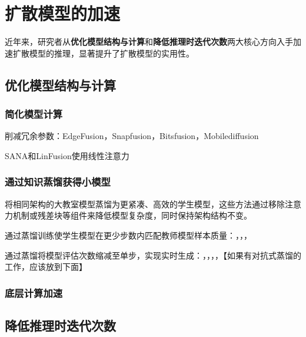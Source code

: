 \documentclass[11pt,a4paper,UTF8]{ctexart}
\begin{document}
\section{扩散模型的加速}

近年来，研究者从\textbf{优化模型结构与计算}和\textbf{降低推理时迭代次数}两大核心方向入手加速扩散模型的推理，显著提升了扩散模型的实用性。

\subsection{优化模型结构与计算}

\subsubsection{简化模型计算}

削减冗余参数：EdgeFusion\cite{castells2024edgefusion}，Snapfusion\cite{li2023snapfusion}，Bitsfusion\cite{sui2024bitsfusion}，Mobilediffusion\cite{zhao2024mobilediffusion}

SANA\cite{xie2024sana}和LinFusion\cite{liu2024linfusion}使用线性注意力\cite{cai2023efficientvit,dao2024transformers,katharopoulos2020transformers}

\subsubsection{通过知识蒸馏获得小模型}

将相同架构的大教室模型蒸馏为更紧凑、高效的学生模型\cite{kim2023bk,liu2024linfusion}，这些方法通过移除注意力机制\cite{vaswani2017attention}或残差块\cite{he2016deep}等组件来降低模型复杂度，同时保持架构结构不变。

通过蒸馏训练使学生模型在更少步数内匹配教师模型样本质量：\cite{luo2023lcm}，\cite{meng2023distillation}，\cite{salimans2022progressive}，\cite{song2023consistency}

通过蒸馏将模型评估次数缩减至单步，实现实时生成：\cite{lin2024sdxl}，\cite{luo2023lcm}，\cite{sauer2024adversarial}，\cite{xu2024ufogen}，\cite{yin2024one}【如果有对抗式蒸馏的工作，应该放到下面】


\subsubsection{底层计算加速}

\cite{chen2023speed}

\subsection{降低推理时迭代次数}
\end{document}

